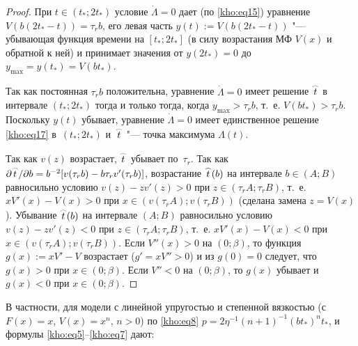 \begin{proof} При $t\in(t_\ast;2t_\ast)$ условие $\dot{\Lambda}=0$ дает (по \eqref{kho:eq15}) уравнение $V(b(2t_\ast-t))=\tau_rb$, его левая часть $y(t):=V(b(2t_\ast-t))$ "--- убывающая функция времени на $[t_\ast;2t_\ast]$ (в силу возрастания МФ $V(x)$ и обратной к ней) и принимает значения от $y(2t_\ast)=0$ до $y_{\max}=y(t_\ast)=V(bt_\ast)$. 

Так как постоянная $\tau_rb$ положительна, уравнение $\dot{\Lambda}=0$ имеет решение $\mathord{\buildrel{\lower3pt\hbox{$\scriptscriptstyle\frown$}}\over{t}}$ в интервале $(t_\ast;2t_\ast)$ тогда и только тогда, когда $y_{\max}>\tau_rb$, т.~е. $V(bt_\ast)>\tau_rb$. Поскольку $y(t)$ убывает, уравнение $\dot{\Lambda}=0$ имеет единственное решение \eqref{kho:eq17} в~$(t_\ast;2t_\ast)$ и~$\mathord{\buildrel{\lower3pt\hbox{$\scriptscriptstyle\frown$}}\over{t}}$ "--- точка максимума $\Lambda(t)$. 

Так как $v(z)$ возрастает, $\mathord{\buildrel{\lower3pt\hbox{$\scriptscriptstyle\frown$}}\over{t}}$ убывает по~$\tau_r$. Так как $\partial\mathord{\buildrel{\lower3pt\hbox{$\scriptscriptstyle\frown$}}\over{t}}/\partial b=b^{-2}[v(\tau_rb)-b\tau_rv'(\tau_rb)]$,  возрастание $\mathord{\buildrel{\lower3pt\hbox{$\scriptscriptstyle\frown$}}\over{t}}(b)$ на интервале $b\in(A;B)$ равносильно условию $v(z)-zv'(z)>0$ при $z\in(\tau_rA;\tau_rB)$, т.~е. $xV'(x)-V(x)>0$ при $x\in (v(\tau_rA);v(\tau_rB))$ (сделана замена $z=V(x)$). Убывание $\mathord{\buildrel{\lower3pt\hbox{$\scriptscriptstyle\frown$}}\over{t}}(b)$ на интервале $(A;B)$ равносильно условию $v(z)-zv'(z)<0$ при $z\in(\tau_rA;\tau_rB)$, т.~е. $xV'(x)-V(x)<0$ при $x\in(v(\tau_rA);v(\tau_rB))$. Если $V''(x)>0$ на $(0;\beta)$, то функция $g(x):=xV'-V$ возрастает ($g'=xV''>0$) и из $g(0)=0$ следует, что $g(x)>0$ при $x\in(0;\beta)$. Если $V''<0$ на $(0;\beta)$, то $g(x)$ убывает и~$g(x)<0$ при $x\in(0;\beta)$. \end{proof}



\smallskip



В частности, для модели с линейной упругостью и степенной вязкостью (с $F(x)=x$, $V(x)=x^n$, $n>0$) по \eqref{kho:eq8} $p=2\eta^{-1}(n+1)^{-1}(bt_\ast)^nt_\ast$, и формулы \eqref{kho:eq5}--\eqref{kho:eq7} дают:

